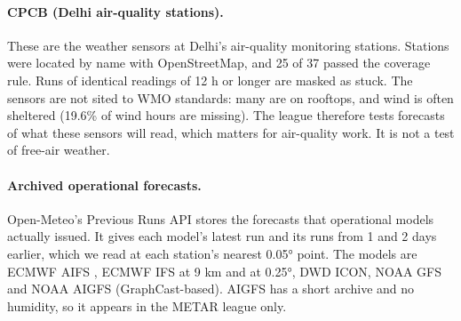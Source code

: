 \paragraph{CPCB (Delhi air-quality stations).}
These are the weather sensors at Delhi's air-quality monitoring stations. Stations were located by name with
OpenStreetMap, and 25 of 37 passed the coverage rule. Runs of identical readings of 12 h or longer are masked as
stuck. The sensors are not sited to WMO standards: many are on rooftops, and wind is often sheltered (19.6\% of wind
hours are missing). The league therefore tests forecasts of what these sensors will read, which matters for
air-quality work. It is not a test of free-air weather.

\paragraph{Archived operational forecasts.}
Open-Meteo's Previous Runs API \citep{openmeteo} stores the forecasts that operational models actually issued. It
gives each model's latest run and its runs from 1 and 2 days earlier, which we read at each station's nearest
0.05° point. The models are ECMWF AIFS \citep{lang2024aifs}, ECMWF IFS at 9 km and at 0.25°, DWD ICON, NOAA GFS and
NOAA AIGFS (GraphCast-based). AIGFS has a short archive and no humidity, so it appears in the METAR
league only.
